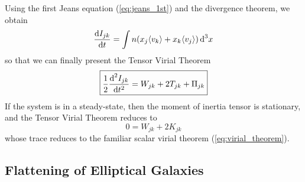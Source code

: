 Using the first Jeans equation (\ref{eq:jeans_1st}) and the divergence theorem, we obtain 
\begin{equation*}
    \frac{\text{d}I_{jk}}{\text{d}t} = \int n(x_{j}\langle v_{k}\rangle+ x_{k}\langle v_{j}\rangle )\,\text{d}^{3}x
\end{equation*}
so that we can finally present the Tensor Virial Theorem
\begin{equation}
    \boxed{
    \frac{1}{2}\frac{\text{d}^{2}I_{jk}}{\text{d}t^{2}} = W_{jk}+2T_{jk}+\Pi_{jk}
    }
    \label{eq:tensorvirialtheorem}
\end{equation}
If the system is in a steady-state, then the moment of inertia tensor is stationary, and the Tensor Virial Theorem reduces to
\begin{equation*}
    0 = W_{jk}+2K_{jk}
\end{equation*}
whose trace reduces to the familiar scalar virial theorem (\ref{eq:virial_theorem}).

\subsection{Flattening of Elliptical Galaxies}

